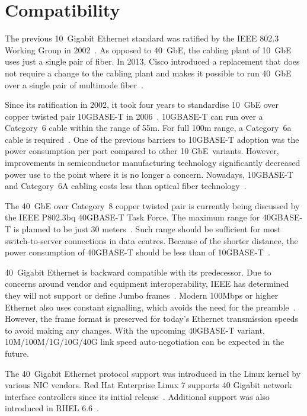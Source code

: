 
\section{Compatibility}\label{sec:40gbe-compatibility}
The previous 10~Gigabit Ethernet standard was ratified by the IEEE 802.3 Working Group in 2002~\cite{ieee-802.3ae}.
As opposed to 40~GbE, the cabling plant of 10~GbE uses just a single pair of fiber.
In 2013, Cisco introduced a replacement that does not require a change to the cabling plant
and makes it possible to run 40~GbE over a single pair of multimode fiber~\cite{40gbe-mmf}.

Since its ratification in 2002,
it took four years to standardise 10~GbE over copper twisted pair 10GBASE-T in 2006~\cite{ieee-802.3an}.
10GBASE-T can run over a Category~6 cable within the range of 55m.
For full 100m range, a Category~6a cable is required~\cite{ieee-802.3an}.
One of the previous barriers to 10GBASE-T adoption was the power consumption per port compared to other 10 GbE~variants.
However, improvements in semiconductor manufacturing technology
significantly decreased power use to the point where it is no longer a concern.
Nowadays, 10GBASE-T and Category~6A cabling costs less than optical fiber technology~\cite{belden-10g-40g}.

The 40~GbE over Category~8 copper twisted pair
is currently being discussed by the IEEE P802.3bq 40GBASE-T Task Force.
The maximum range for 40GBASE-T is planned to be just 30 meters~\cite{ieee-802.3bq}.
Such range should be sufficient for most switch-to-server connections in data centres.
Because of the shorter distance, the power consumption of 40GBASE-T should be less than of 10GBASE-T~\cite{belden-10g-40g}.

40~Gigabit Ethernet is backward compatible with its predecessor.
Due to concerns around vendor and equipment interoperability,
IEEE has determined they will not support or define Jumbo frames~\cite{ea-jumbo-frames}.
Modern 100Mbps or higher Ethernet also uses constant signalling, which avoids the need for the preamble~\cite{anatomy-frame}.
However, the frame format is preserved for today's Ethernet transmission speeds to avoid making any changes.
With the upcoming 40GBASE-T variant, 10M/100M/1G/10G/40G link speed auto-negotiation can be expected in the future.

The 40~Gigabit Ethernet protocol support was introduced in the Linux kernel by various NIC vendors.
Red Hat Enterprise Linux 7 supports 40 Gigabit network interface controllers since its initial release~\cite{rhel-7-announce}.
Additional support was also introduced in RHEL 6.6~\cite{rhel-66-announce}.
